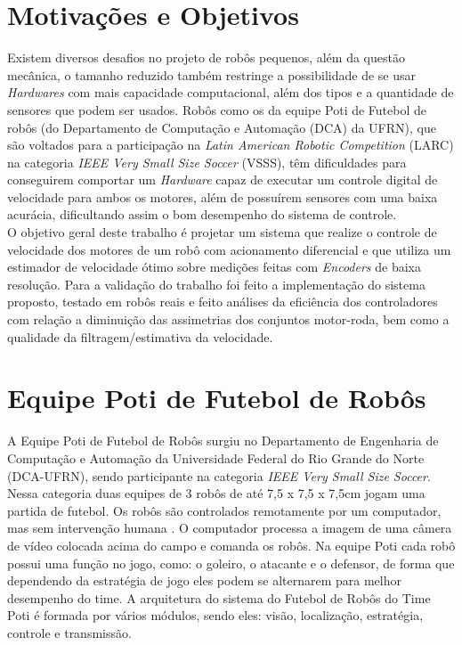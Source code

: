 \section{Motivações e Objetivos}
Existem diversos desafios no projeto de robôs pequenos, além da questão mecânica, o tamanho reduzido também restringe a possibilidade de se usar \emph{Hardwares} com mais capacidade computacional, além dos tipos e a quantidade de sensores que podem ser usados. Robôs como os da equipe Poti de Futebol de robôs (do Departamento de Computação e Automação (DCA) da UFRN), que são voltados para a participação na \emph{Latin American Robotic Competition} (LARC) na categoria \emph{IEEE Very Small Size Soccer} (VSSS), têm dificuldades para conseguirem comportar um \emph{Hardware} capaz de executar um controle digital de velocidade para ambos os motores, além de possuírem sensores com uma baixa acurácia, dificultando assim o bom desempenho do sistema de controle.\\

O objetivo geral deste trabalho é projetar um sistema que realize o controle de velocidade dos motores de um robô com acionamento diferencial e que utiliza um estimador de velocidade ótimo sobre medições feitas com \emph{Encoders} de baixa resolução. Para a validação do trabalho foi feito a implementação do sistema proposto, testado em robôs reais e feito análises da eficiência dos controladores com relação a diminuição das assimetrias dos conjuntos motor-roda, bem como a qualidade da filtragem/estimativa da velocidade. %

\section{Equipe Poti de Futebol de Robôs}
\label{sec:Equipe_Poti}

A Equipe Poti de Futebol de Robôs surgiu no Departamento de Engenharia de Computação e Automação da Universidade Federal do Rio Grande do Norte (DCA-UFRN), sendo participante na categoria \emph{IEEE Very Small Size Soccer}.\\

Nessa categoria duas equipes de 3 robôs de até 7,5 x 7,5 x 7,5cm jogam uma partida de futebol. Os robôs são controlados remotamente por um computador, mas sem intervenção humana \cite{VSSS}. O computador processa a imagem de uma câmera de vídeo colocada acima do campo e comanda os robôs. Na equipe Poti cada robô possui uma função no jogo, como: o goleiro, o atacante e o defensor, de forma que dependendo da estratégia de jogo eles podem se alternarem para melhor desempenho do time. A arquitetura do sistema do Futebol de Robôs do Time Poti é formada por vários módulos, sendo eles: visão, localização, estratégia, controle e transmissão.\\


